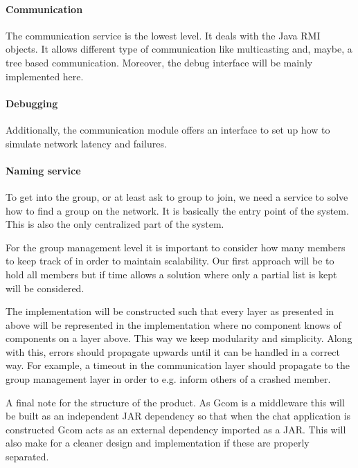 \paragraph{Communication}{
	The communication service is the lowest level. It deals
 with the Java RMI objects. It allows different type of
 communication like multicasting and, maybe, a tree based
 communication.  \newline
 Moreover, the debug interface will be mainly implemented here.
}

\paragraph{Debugging}{
	Additionally, the communication module offers an interface
 to set up how to simulate network latency and failures.
}

\paragraph{Naming service}{
	To get into the group, or at least ask to group to join,
 we need a service to solve how to find a group on the network.
 It is basically the entry point of the system.
 This is also the only centralized part of the system.
}

	For the group management level it is important to consider
 how many members to keep track of in order to maintain
 scalability. Our first approach will be to hold all members
 but if time allows a solution where only a partial list is kept
 will be considered.

The implementation will be constructed such that every layer
as presented in above will be represented in the implementation
where no component knows of components on a layer above.
This way we keep modularity and simplicity.
Along with this, errors should propagate upwards until it can
be handled in a correct way. For example, a timeout in the 
communication layer should propagate to the group management layer
in order to e.g. inform others of a crashed member.

A final note for the structure of the product.
As Gcom is a middleware this will be built as an independent JAR
dependency so that when the chat application is constructed
Gcom acts as an external dependency imported as a JAR.
This will also make for a cleaner design and implementation
if these are properly separated.
